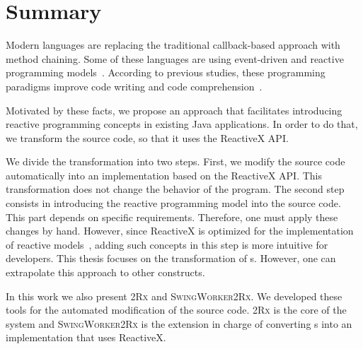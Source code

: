 \documentclass[type=bsc,accentcolor=tud9c]{tudthesis}
\newcommand{\framework}[1]{\textcolor{black!65}{#1}}
\newcommand{\toolcore}{\textsc{2Rx}}
\newcommand{\toolextension}{\textsc{SwingWorker2Rx}}
\begin{document}

\author{Grebiel José Ifill Brito}
\date{February 2017}

\makethesistitle

\chapter*{Summary}
Modern languages are replacing the traditional callback-based approach with method chaining. Some of these languages are using event-driven and reactive programming models~\cite{agera, reactiveX, paperFlapjax}. According to previous studies, these programming paradigms improve code writing and code comprehension~\cite{promises, paperReactiveComprehension}.

Motivated by these facts, we propose an approach that facilitates introducing reactive programming concepts in existing \framework{Java} applications. In order to do that, we transform the source code, so that it uses the \framework{ReactiveX} API. 

We divide the transformation into two steps. First, we modify the source code automatically into an implementation based on the \framework{ReactiveX} API. This transformation does not change the behavior of the program. The second step consists in introducing the reactive programming model into the source code. This part depends on specific requirements. Therefore, one must apply these changes by hand. However, since \framework{ReactiveX} is optimized for the implementation of reactive models~\cite{reactiveX}, adding such concepts in this step is more intuitive for developers. This thesis focuses on the transformation of s. However, one can extrapolate this approach to other constructs. 

In this work we also present \toolcore{} and \toolextension{}. We developed these tools for the automated modification of the source code. \toolcore{} is the core of the system and \toolextension{} is the extension in charge of converting s into an implementation that uses \framework{ReactiveX}. 
\end{document}
